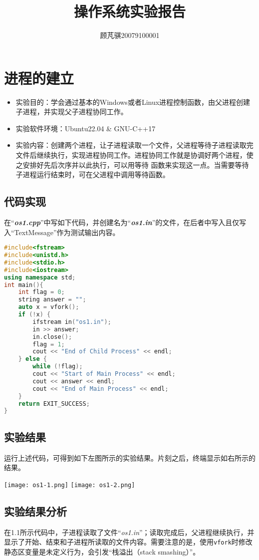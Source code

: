 \documentclass[UTF8]{ctexart}
\title{操作系统实验报告}
\author{顾芃骐20079100001}
\begin{document}
	\maketitle
	\newpage
	\section{进程的建立}
	\begin{itemize}
		\item 实验目的：学会通过基本的Windows或者Linux进程控制函数，由父进程创建子进程，并实现父子进程协同工作。
		\item 实验软件环境：Ubuntu22.04 \& GNU-C++17
		\item 实验内容：创建两个进程，让子进程读取一个文件，父进程等待子进程读取完文件后继续执行，实现进程协同工作。进程协同工作就是协调好两个进程，使之安排好先后次序并以此执行，可以用等待 函数来实现这一点。当需要等待子进程运行结束时，可在父进程中调用等待函数。
	\end{itemize}
	\subsection{代码实现}
    在“\textbf{\textit{os1.cpp}}”中写如下代码，并创建名为“\textbf{\textit{os1.in}}”的文件，在后者中写入且仅写入“TextMessage”作为测试输出内容。
\begin{lstlisting}[language=c++]
#include<fstream>
#include<unistd.h>
#include<stdio.h>
#include<iostream>
using namespace std;
int main(){
	int flag = 0;
	string answer = "";
	auto x = vfork();
	if (!x) {
		ifstream in("os1.in");
		in >> answer;
		in.close();
		flag = 1;
		cout << "End of Child Process" << endl;
	} else {
		while (!flag);
		cout << "Start of Main Process" << endl;
		cout << answer << endl;
		cout << "End of Main Process" << endl;
	}
	return EXIT_SUCCESS;
}
\end{lstlisting}
\subsection{实验结果}
运行上述代码，可得到如下左图所示的实验结果。片刻之后，终端显示如右所示的结果。
\begin{center}
        \texttt{[image: os1-1.png]}
        \texttt{[image: os1-2.png]}
\end{center}
\subsection{实验结果分析}
在1.1所示代码中，子进程读取了文件“\textit{os1.in}”；读取完成后，父进程继续执行，并显示了开始、结束和子进程所读取的文件内容。需要注意的是，使用\texttt{vfork}时修改静态区变量是未定义行为，会引发“栈溢出（stack smashing）”。
\end{document}
